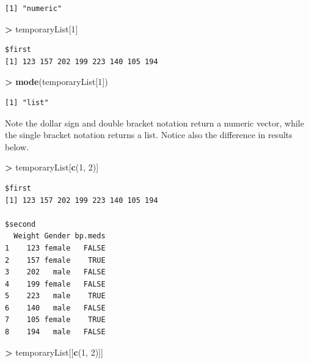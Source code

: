 \documentclass[]{krantz}
\makeatletter
\newenvironment{Shaded}{\begin{snugshade}}{\end{snugshade}}
\newcommand{\DecValTok}[1]{\textcolor[rgb]{0.06,0.06,0.06}{#1}}
\newcommand{\KeywordTok}[1]{\textcolor[rgb]{0.27,0.27,0.27}{\textbf{#1}}}
\newcommand{\NormalTok}[1]{#1}
\newcommand{\OperatorTok}[1]{\textcolor[rgb]{0.43,0.43,0.43}{\textbf{#1}}}
\newcommand{\StringTok}[1]{\textcolor[rgb]{0.5,0.5,0.5}{#1}}
\newenvironment{kframe}{%
\medskip{}
\setlength{\fboxsep}{.8em}
 \def\at@end@of@kframe{}%
 \ifinner\ifhmode%
  \def\at@end@of@kframe{\end{minipage}}%
  \begin{minipage}{\columnwidth}%
 \fi\fi%
 \def\FrameCommand##1{\hskip\@totalleftmargin \hskip-\fboxsep
 \colorbox{shadecolor}{##1}\hskip-\fboxsep
     \hskip-\linewidth \hskip-\@totalleftmargin \hskip\columnwidth}%
 \MakeFramed {\advance\hsize-\width
   \@totalleftmargin\z@ \linewidth\hsize
   \@setminipage}}%
 {\par\unskip\endMakeFramed%
 \at@end@of@kframe}
\renewenvironment{Shaded}{\begin{kframe}}{\end{kframe}}
\makeatother
\begin{document}
\begin{verbatim}
[1] "numeric"
\end{verbatim}

\begin{Shaded}
\begin{Highlighting}[]
\OperatorTok{>}\StringTok{ }\NormalTok{temporaryList[}\DecValTok{1}\NormalTok{]}
\end{Highlighting}
\end{Shaded}

\begin{verbatim}
$first
[1] 123 157 202 199 223 140 105 194
\end{verbatim}

\begin{Shaded}
\begin{Highlighting}[]
\OperatorTok{>}\StringTok{ }\KeywordTok{mode}\NormalTok{(temporaryList[}\DecValTok{1}\NormalTok{])}
\end{Highlighting}
\end{Shaded}

\begin{verbatim}
[1] "list"
\end{verbatim}

Note the dollar sign and double bracket notation return a numeric vector, while the single bracket notation returns a list. Notice also the difference in results below.

\begin{Shaded}
\begin{Highlighting}[]
\OperatorTok{>}\StringTok{ }\NormalTok{temporaryList[}\KeywordTok{c}\NormalTok{(}\DecValTok{1}\NormalTok{, }\DecValTok{2}\NormalTok{)]}
\end{Highlighting}
\end{Shaded}

\begin{verbatim}
$first
[1] 123 157 202 199 223 140 105 194

$second
  Weight Gender bp.meds
1    123 female   FALSE
2    157 female    TRUE
3    202   male   FALSE
4    199 female   FALSE
5    223   male    TRUE
6    140   male   FALSE
7    105 female    TRUE
8    194   male   FALSE
\end{verbatim}

\begin{Shaded}
\begin{Highlighting}[]
\OperatorTok{>}\StringTok{ }\NormalTok{temporaryList[[}\KeywordTok{c}\NormalTok{(}\DecValTok{1}\NormalTok{, }\DecValTok{2}\NormalTok{)]]}
\end{Highlighting}
\end{Shaded}
\end{document}
